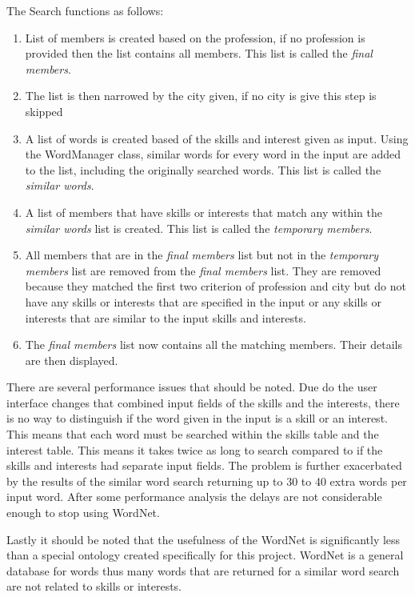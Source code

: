 \documentclass[a4paper,oneside,11pt]{report}
\begin{document}
The Search functions as follows:
\begin{enumerate}
  \item List of members is created based on the profession, if no profession is provided then the list contains all members. This list is called the \textit{final members}.
  \item The list is then narrowed by the city given, if no city is give this step is skipped
  \item A list of words is created based of the skills and interest given as input. Using the WordManager class, similar words for every word in the input are added to the list, including the originally searched words. This list is called the \textit{similar words}.
  \item A list of members that have skills or interests that match any within the \textit{similar words} list is created. This list is called the \textit{temporary members}.
  \item All members that are in the \textit{final members} list but not in the  \textit{temporary members} list are removed from the \textit{final members} list. They are removed because they matched the first two criterion of profession and city but do not have any skills or interests that are specified in the input or any skills or interests that are similar to the input skills and interests.
  \item The \textit{final members} list now contains all the matching members. Their details are then displayed.
\end{enumerate}

There are several performance issues that should be noted. Due do the user interface changes that combined input fields of the skills and the interests, there is no way to distinguish if the word given in the input is a skill or an interest. This means that each word must be searched within the skills table and the interest table. This means it takes twice as long to search compared to if the skills and interests had separate input fields. The problem is further exacerbated by the results of the similar word search returning up to 30 to 40 extra words per input word. After some performance analysis the delays are not considerable enough to stop using WordNet.

Lastly it should be noted that the usefulness of the WordNet is significantly less than a special ontology created specifically for this project. WordNet is a general database for words thus many words that are returned for a similar word search are not related to skills or interests.
\end{document}
